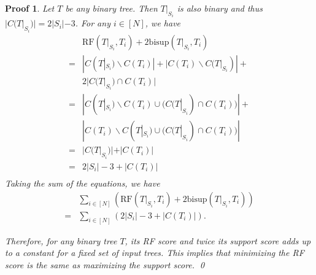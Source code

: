 \documentclass[twocolumn]{bmcart}%
\newcommand{\bs}{\mathrm{bisup}}
\newcommand{\RF}{\mathrm{RF}}
\theoremstyle{mystyle}
\theoremstyle{proofstyle}
\newtheorem*{proof2}{Proof}
\newenvironment{proofnospace}{\begin{proof2}}{\qed \end{proof2}}
\begin{document}
\lemEquivalentProblemsBinary*
\begin{proofnospace}
    Let $T$ be any binary tree. Then $T|_{S_i}$ is also binary and thus $|C(T|_{S_i})| = 2|S_i| -3$.
    For any $i \in [N]$, we have 
    \begin{align*}
        &\RF(T|_{S_i},T_i)+2\bs(T|_{S_i},T_i) \\ 
        =& |C(T|_{S_i})\backslash C(T_i)| + |C(T_i) \backslash C(T|_{S_i})| + \\ 
        & 2|C(T|_{S_i}) \cap C(T_i)| \\
        =& |C(T|_{S_i})\backslash C(T_i) \cup (C(T|_{S_i}) \cap C(T_i))| + \\
        &|C(T_i) \backslash C(T|_{S_i}) \cup (C(T|_{S_i}) \cap C(T_i))|\\
        =& |C(T|_{S_i})| + |C(T_i)|\\
        = & 2|S_i| -3 + |C(T_i)|\\
    \end{align*}
    Taking the sum of the equations, we have
    \begin{align*}
        &\sum_{i \in [N]} (\RF(T|_{S_i}, T_i) + 2\bs(T|_{S_i},T_i)) \\=& \sum_{i \in [N]} ( 2|S_i| -3 + |C(T_i)|).
    \end{align*}
    
    
    Therefore, for any binary tree $T$, its RF score and twice its support score adds up to a constant for a fixed set of input trees. This implies that minimizing the RF score is the same as maximizing the support score. 
\end{proofnospace}
\end{document}
